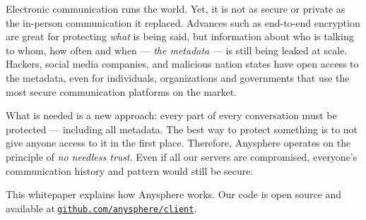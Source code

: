 



Electronic communication runs the world. Yet, it is not as secure or private as the in-person communication it replaced. Advances such as end-to-end encryption are great for protecting \textit{what} is being said, but information about who is talking to whom, how often and when — \textit{the metadata} — is still being leaked at scale. Hackers, social media companies, and malicious nation states have open access to the metadata, even for individuals, organizations and governments that use the most secure communication platforms on the market.



What is needed is a new approach: every part of every conversation must be protected — including all metadata. The best way to protect something is to not give anyone access to it in the first place. Therefore, Anysphere operates on the principle of \textit{no needless trust}. Even if all our servers are compromised, everyone's communication history and pattern would still be secure.

This whitepaper explains how Anysphere works. Our code is open source and available at$~${\tt \href{https://github.com/anysphere/client}{github.com/anysphere/client}}.